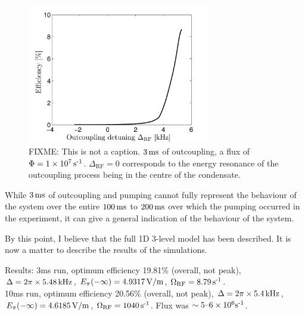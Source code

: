 \begin{figure}
    \centering
    \includegraphics[width=8cm]{3LevelModelEfficiency}
    \caption{FIXME: This is not a caption. $\unit[3]{ms}$ of outcoupling, a flux of $\Phi = 1\times \unit[10^7]{s\textsuperscript{-1}}$.  $\Delta_\text{RF} =0$ corresponds to the energy resonance of the outcoupling process being in the centre of the condensate.}
    \label{OpticalPumping:3LevelModelEfficiency}
\end{figure}


While $\unit[3]{ms}$ of outcoupling and pumping cannot fully represent the behaviour of the system over the entire $\unit[100]{ms}$ to $\unit[200]{ms}$ over which the pumping occurred in the experiment, it can give a general indication of the behaviour of the system. 




By this point, I believe that the full 1D 3-level model has been described.  It is now a matter to describe the results of the simulations.

Results:
3ms run, optimum efficiency 19.81\% (overall, not peak), $\Delta = 2\pi \times \unit[5.48]{kHz}$, $E_{\pi}(-\infty) = \unit[4.9317]{V/m}$, $\Omega_\text{RF} = \unit[8.79]{s\textsuperscript{-1}}$.\\
10ms run, optimum efficiency 20.56\% (overall, not peak), $\Delta = 2\pi \times \unit[5.4]{kHz}$, $E_{\pi}(-\infty) = \unit[4.6185]{V/m}$, $\Omega_\text{RF} = \unit[1040]{s\textsuperscript{-1}}$.  Flux was $\sim 5\text{--}6\times 10^6\unit{s\textsuperscript{-1}}$.



